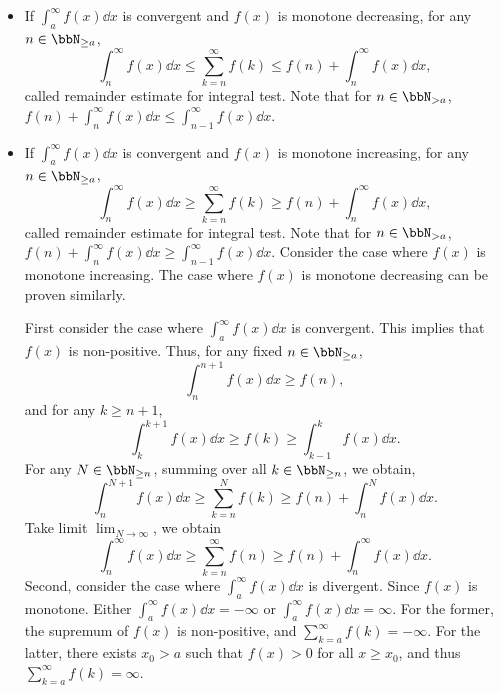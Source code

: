 \documentclass[a4paper,12pt]{report}
\begin{document}
\begin{itemize}
\begin{itemize}
\subsection{Limit of real series theorems}
\subsubsection{Integral test (for convergence) or Maclaurin–Cauchy test}
Suppose $f(x)\colon[a,\infty)\to\bbR$ for some $a\in\bbN$ is monotone and $\lim_{x\to\infty}f(x)=0$. Then $\int_a^{\infty}f(x)\dd{x}$ is convergent iff $\sum_{k=a}^{\infty}f(k)$ is convergent. And,
\bit
\item If $\int_a^{\infty}f(x)\dd{x}$ is convergent and $f(x)$ is monotone decreasing, for any $n\in\bbN_{\ge a}$,
\[\int_n^{\infty}f(x)\dd{x}\le\sum_{k=n}^{\infty}f(k)\le f(n)+\int_n^{\infty}f(x)\dd{x},\]
called remainder estimate for integral test. Note that for $n\in\bbN_{>a}$, $f(n)+\int_n^{\infty}f(x)\dd{x}\le\int_{n-1}^{\infty}f(x)\dd{x}$.
\item If $\int_a^{\infty}f(x)\dd{x}$ is convergent and $f(x)$ is monotone increasing, for any $n\in\bbN_{\ge a}$,
\[\int_n^{\infty}f(x)\dd{x}\ge\sum_{k=n}^{\infty}f(k)\ge f(n)+\int_n^{\infty}f(x)\dd{x},\]
called remainder estimate for integral test. Note that for $n\in\bbN_{>a}$, $f(n)+\int_n^{\infty}f(x)\dd{x}\ge\int_{n-1}^{\infty}f(x)\dd{x}$.
\eit
\bpr
Consider the case where $f(x)$ is monotone increasing. The case where $f(x)$ is monotone decreasing can be proven similarly.

First consider the case where $\int_a^{\infty}f(x)\dd{x}$ is convergent. This implies that $f(x)$ is non-positive. Thus, for any fixed $n\in\bbN_{\ge a}$,
\[\int_n^{n+1}f(x)\dd{x}\ge f(n),\]
and for any $k\geq n+1$,
\[\int_k^{k+1}f(x)\dd{x}\ge f(k)\ge\int_{k-1}^kf(x)\dd{x}.\]
For any $N\in\bbN_{\ge n}$, summing over all $k\in\bbN_{\ge n}$, we obtain, 
\[\int_n^{N+1}f(x)\dd{x}\ge\sum_{k=n}^Nf(k)\ge f(n)+\int_n^Nf(x)\dd{x}.\]
Take limit $\lim_{N\to\infty}$, we obtain
\[\int_n^{\infty}f(x)\dd{x}\ge\sum_{k=n}^{\infty}f(n)\ge f(n)+\int_n^{\infty}f(x)\dd{x}.\]
Second, consider the case where $\int_a^{\infty}f(x)\dd{x}$ is divergent. Since $f(x)$ is monotone. Either $\int_a^{\infty}f(x)\dd{x}=-\infty$ or $\int_a^{\infty}f(x)\dd{x}=\infty$. For the former, the supremum of $f(x)$ is non-positive, and $\sum_{k=a}^{\infty}f(k)=-\infty$. For the latter, there exists $x_0>a$ such that $f(x)>0$ for all $x\ge x_0$, and thus $\sum_{k=a}^{\infty}f(k)=\infty$.
\epr

\end{itemize}
\end{itemize}
\end{document}
